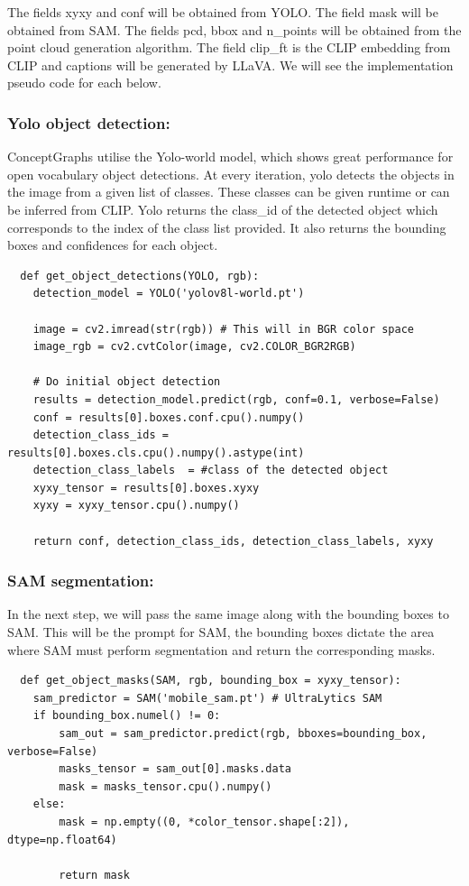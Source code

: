 The fields xyxy and conf will be obtained from YOLO. The field mask will be obtained from SAM.
The fields pcd, bbox and n\_points will be obtained from the point cloud generation algorithm. The field clip\_ft is the 
CLIP embedding from CLIP and captions will be generated by LLaVA. We will see the implementation pseudo code for each below.

\subsubsection{Yolo object detection:}
ConceptGraphs utilise the Yolo-world model, which shows great performance for open vocabulary object detections. At every iteration, yolo detects the objects in the image
 from a given list of classes. These classes can be given runtime or can be inferred from CLIP. Yolo returns the class\_id of the detected object which corresponds to the index of the class list provided.
 It also returns the bounding boxes and confidences for each object. 
 \begin{lstlisting}
  def get_object_detections(YOLO, rgb):
    detection_model = YOLO('yolov8l-world.pt')

    image = cv2.imread(str(rgb)) # This will in BGR color space
    image_rgb = cv2.cvtColor(image, cv2.COLOR_BGR2RGB)

    # Do initial object detection
    results = detection_model.predict(rgb, conf=0.1, verbose=False)
    conf = results[0].boxes.conf.cpu().numpy()
    detection_class_ids = results[0].boxes.cls.cpu().numpy().astype(int)
    detection_class_labels  = #class of the detected object
    xyxy_tensor = results[0].boxes.xyxy
    xyxy = xyxy_tensor.cpu().numpy()

    return conf, detection_class_ids, detection_class_labels, xyxy
\end{lstlisting}

\subsubsection{SAM segmentation:}
In the next step, we will pass the same image along with the bounding boxes to SAM. This will be the prompt for SAM, the bounding boxes dictate
 the area where SAM must perform segmentation and return the corresponding masks.
\begin{lstlisting}
  def get_object_masks(SAM, rgb, bounding_box = xyxy_tensor):
    sam_predictor = SAM('mobile_sam.pt') # UltraLytics SAM
    if bounding_box.numel() != 0:
        sam_out = sam_predictor.predict(rgb, bboxes=bounding_box, verbose=False)
        masks_tensor = sam_out[0].masks.data
        mask = masks_tensor.cpu().numpy()
    else:
        mask = np.empty((0, *color_tensor.shape[:2]), dtype=np.float64)
    
        return mask
\end{lstlisting}
